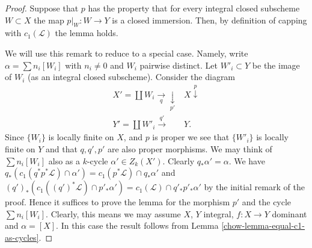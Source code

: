 \begin{proof}

Suppose that $p$ has the property that for every integral
closed subscheme $W \subset X$ the map $p|_W : W \to Y$
is a closed immersion. Then, by definition of capping
with $c_1(\mathcal{L})$ the lemma holds.

\medskip\noindent
We will use this remark to reduce to a special case. Namely,
write $\alpha = \sum n_i[W_i]$ with $n_i \not = 0$ and $W_i$ pairwise
distinct. Let $W'_i \subset Y$ be the image of $W_i$ (as an integral
closed subscheme). Consider the diagram
$$
\begin{array}{cc}X' = \coprod W_i \underset{q}{\longrightarrow}\underset{p'}{\downarrow} & X \overset{p}{\downarrow} \\ Y' = \coprod W'_i \overset{q'}{\longrightarrow} & Y.\end{array}
$$
Since $\{W_i\}$ is locally finite on $X$, and $p$ is proper
we see that $\{W'_i\}$ is locally finite on $Y$ and that
$q, q', p'$ are also proper morphisms.
We may think of $\sum n_i[W_i]$ also as a $k$-cycle
$\alpha' \in Z_k(X')$. Clearly $q_*\alpha' = \alpha$.
We have
$q_*(c_1(q^*p^*\mathcal{L}) \cap \alpha')
= c_1(p^*\mathcal{L}) \cap q_*\alpha'$
and
$(q')_*(c_1((q')^*\mathcal{L}) \cap p'_*\alpha') =
c_1(\mathcal{L}) \cap q'_*p'_*\alpha'$ by the initial
remark of the proof. Hence it suffices to prove the lemma
for the morphism $p'$ and the cycle $\sum n_i[W_i]$.
Clearly, this means we may assume $X$, $Y$ integral,
$f : X \to Y$ dominant and $\alpha = [X]$.
In this case the result follows from
Lemma \ref{chow-lemma-equal-c1-as-cycles}.
\end{proof}

